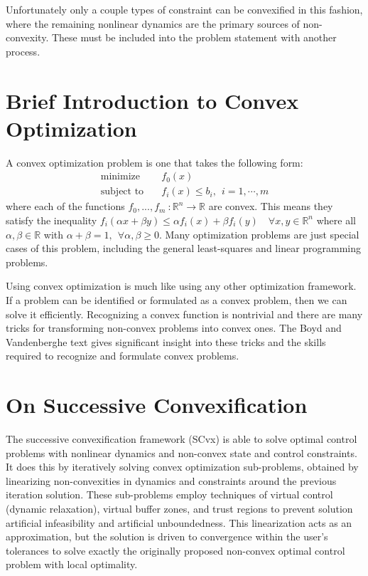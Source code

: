 Unfortunately only a couple types of constraint can be convexified in this fashion, where the remaining nonlinear dynamics are the primary sources of non-convexity. These must be included into the problem statement with another process.

\section{Brief Introduction to Convex Optimization}
A convex optimization problem is one that takes the following form:
\begin{align*}
	\text{minimize} \quad & f_0(x) \\ 
	\text{subject to} \quad & f_i(x) \leq b_i, \ \ i = 1, \cdots, m
\end{align*}
where each of the functions $f_0,...,f_m \ :\mathbb{R}^n \rightarrow \mathbb{R}$ are convex. This means they satisfy the inequality $f_i(\alpha x + \beta y) \leq \alpha f_i(x) + \beta f_i(y) \quad \forall x, y \in \mathbb{R}^n$ where all $\alpha, \beta \in \mathbb{R}$ with $\alpha + \beta = 1,\ \ \forall \alpha,\beta \geq 0$. Many optimization problems are just special cases of this problem, including the general least-squares and linear programming problems.

Using convex optimization is much like using any other optimization framework. If a problem can be identified or formulated as a convex problem, then we can solve it efficiently. Recognizing a convex function is nontrivial and there are many tricks for transforming non-convex problems into convex ones. The Boyd and Vandenberghe text \cite{boyd2004convex} gives significant insight into these tricks and the skills required to recognize and formulate convex problems.

\section{On Successive Convexification}
The successive convexification framework (SCvx) is able to solve optimal control problems with nonlinear dynamics and non-convex state and control constraints. It does this by iteratively solving convex optimization sub-problems, obtained by linearizing non-convexities in dynamics and constraints around the previous iteration solution. These sub-problems employ techniques of virtual control (dynamic relaxation), virtual buffer zones, and trust regions to prevent solution artificial infeasibility and artificial unboundedness. This linearization acts as an approximation, but the solution is driven to convergence within the user's tolerances to solve exactly the originally proposed non-convex optimal control problem with local optimality.

